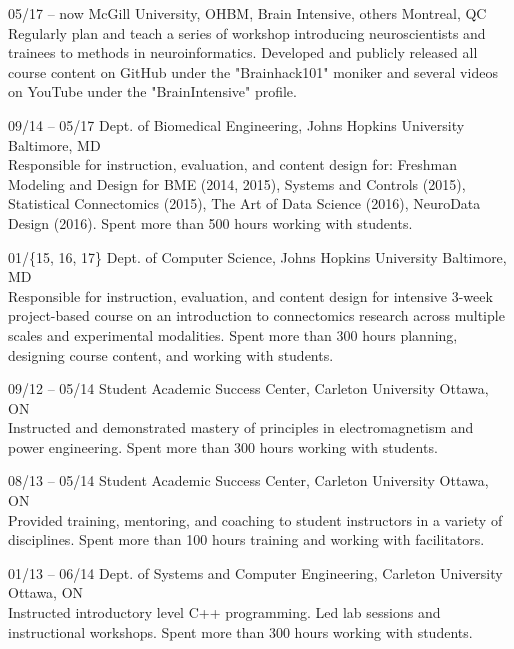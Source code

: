 \documentclass[]{friggeri-cv} %
\begin{document}
\begin{entrylist}
\entry
{05/17 -- now}
{McGill University, OHBM, Brain Intensive, others}
{Montreal, QC}
{ \\
Regularly plan and teach a series of workshop introducing neuroscientists and trainees to methods in neuroinformatics.
Developed and publicly released all course content on GitHub under the "Brainhack101" moniker and several videos on
YouTube under the "BrainIntensive" profile.}

\entry
{09/14 -- 05/17}
{Dept. of Biomedical Engineering, Johns Hopkins University}
{Baltimore, MD}
{ \\
Responsible for instruction, evaluation, and content design for: Freshman Modeling and Design
for BME (2014, 2015), Systems and Controls (2015), Statistical Connectomics (2015), The Art of
Data Science (2016), NeuroData Design (2016). Spent more than 500 hours working with students.}

\entry
{01/\{15, 16, 17\}}
{Dept. of Computer Science, Johns Hopkins University}
{Baltimore, MD}
{\\
Responsible for instruction, evaluation, and content design for intensive 3-week project-based course on an
introduction to connectomics research across multiple scales and experimental modalities. Spent more than 300 hours
planning, designing course content, and working with students.}

\entry
{09/12 -- 05/14}
{Student Academic Success Center, Carleton University}
{Ottawa, ON}
{\\
Instructed and demonstrated mastery of principles in electromagnetism and power engineering. Spent more than 300 hours
working with students.}

\entry
{08/13 -- 05/14}
{Student Academic Success Center, Carleton University}
{Ottawa, ON}
{\\
Provided training, mentoring, and coaching to student instructors in a variety of disciplines. Spent more than 100
hours training and working with facilitators.}
\end{entrylist}

\begin{entrylist}
\entry
{01/13 -- 06/14}
{Dept. of Systems and Computer Engineering, Carleton University}
{Ottawa, ON}
{\\
Instructed introductory level C++ programming. Led lab sessions and instructional workshops. Spent more than 300 hours
working with students.}
\end{entrylist}
\end{document}
